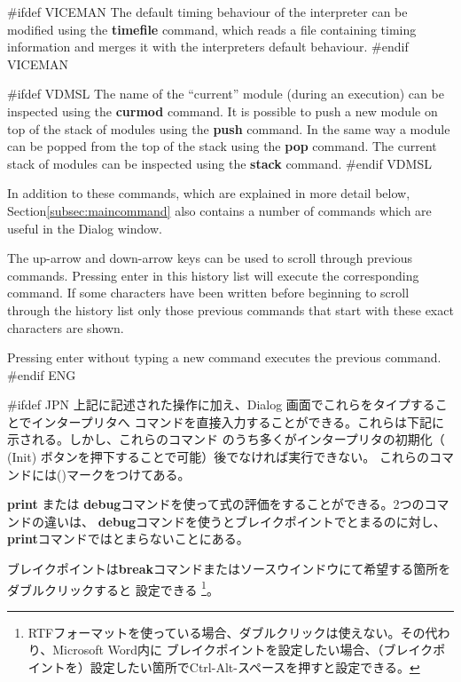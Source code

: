 \documentclass[\pformat,12pt]{article}
\newcommand{\guicmd}[1]{{\sf #1}}
\newcommand{\guicmd}[1]{{\gt #1}}
\begin{document}
#ifdef VICEMAN
The default timing behaviour of the interpreter can be modified using
the \textbf{timefile} command, which reads a file containing timing
information and merges it with the interpreters default behaviour.
#endif VICEMAN

#ifdef VDMSL
The name of the ``current'' module (during an execution) can be
inspected using the \textbf{curmod} command. It is possible to push a 
new module on top of the stack of modules using the \textbf{push}
command. In the same way a module can be popped from the top of the
stack using the \textbf{pop} command. The current stack of modules can
be inspected using the \textbf{stack} command.
#endif VDMSL

In addition to these commands, which are explained in more detail below,
Section\ref{subsec:maincommand} also contains a number of commands
which are useful in the \guicmd{Dialog} window.

The up-arrow and down-arrow keys can be used to scroll through
previous commands. Pressing enter in this history list will execute
the corresponding command.  If some characters have been written
before beginning to scroll through the history list only those
previous commands that start with these exact characters are shown.

Pressing enter without typing a new command executes the previous
command.
#endif ENG

#ifdef JPN
上記に記述された操作に加え、\guicmd{Dialog} 画面でこれらをタイプすることでインタープリタへ
コマンドを直接入力することができる。これらは下記に示される。しかし、これらのコマンド
のうち多くがインタープリタの初期化（
(\guicmd{Init}) ボタンを押下することで可能）後でなければ実行できない。
これらのコマンドには({\tt *})マークをつけてある。

\textbf{print} または
\textbf{debug}コマンドを使って式の評価をすることができる。2つのコマンドの違いは、
{\bf debug}コマンドを使うとブレイクポイントでとまるのに対し、{\bf print}コマンドではとまらないことにある。

ブレイクポイントは\textbf{break}コマンドまたは\guicmd{ソース}ウインドウにて希望する箇所をダブルクリックすると
設定できる \footnote{RTFフォーマットを使っている場合、ダブルクリックは使えない。その代わり、Microsoft Word内に
ブレイクポイントを設定したい場合、（ブレイクポイントを）設定したい箇所でCtrl-Alt-スペースを押すと設定できる。}。
\end{document}
